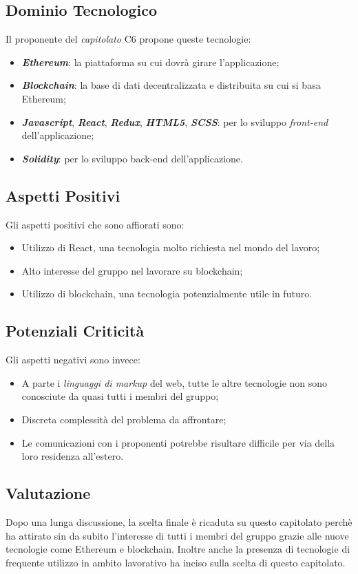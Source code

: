 \subsection{Dominio Tecnologico}
Il proponente del \textit{capitolato} C6 propone queste tecnologie:
\begin{itemize}
	\item \textit{\textbf{Ethereum}}: la piattaforma su cui dovrà girare l'applicazione;
	\item \textit{\textbf{Blockchain}}: la base di dati decentralizzata e distribuita su cui si basa Ethereum;
	\item \textbf{\textit{Javascript}}, \textit{\textbf{React}}, \textit{\textbf{Redux}}, \textbf{\textit{HTML5}}, \textit{\textbf{SCSS}}: 
	per lo sviluppo \textit{front-end} dell'applicazione;
	\item \textit{\textbf{Solidity}}: per lo sviluppo back-end dell'applicazione.
\end{itemize}

\subsection{Aspetti Positivi}
Gli aspetti positivi che sono affiorati sono:
\begin{itemize}
	\item Utilizzo di React, una tecnologia molto richiesta nel mondo del lavoro;
	\item Alto interesse del gruppo nel lavorare su blockchain;
	\item Utilizzo di blockchain, una tecnologia potenzialmente utile in futuro.
\end{itemize}

\subsection{Potenziali Criticità}
Gli aspetti negativi sono invece:
\begin{itemize}
	\item A parte i \textit{linguaggi di markup} del web, tutte le altre tecnologie non sono conosciute da quasi tutti i membri del gruppo;
	\item Discreta complessità del problema da affrontare;
	\item Le comunicazioni con i proponenti potrebbe risultare difficile per via della loro residenza all'estero.
\end{itemize}

\subsection{Valutazione}
Dopo una lunga discussione, la scelta finale è ricaduta su questo capitolato perchè ha attirato sin da subito l'interesse di tutti i membri del gruppo grazie alle nuove tecnologie come Ethereum e blockchain.
Inoltre anche la presenza di tecnologie di frequente utilizzo in ambito lavorativo ha inciso sulla scelta di questo capitolato.